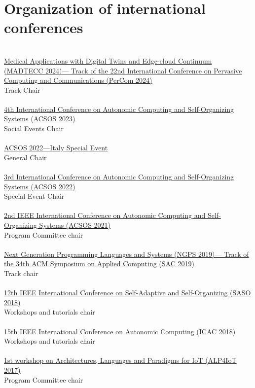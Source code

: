 \section{{\color{black}Organization of international conferences}}
\halfblankline \\
\href{https://madtecc.github.io/}{Medical Applications with Digital Twins and Edge-cloud Continuum (MADTECC 2024)---%
Track of the 22nd International Conference on Pervasive Computing and Communications (PerCom 2024)}
\\ Track Chair \\
\halfblankline \\
\href{https://conf.researchr.org/home/acsos-2023/}{4th International Conference on Autonomic Computing and Self-Organizing Systems
(ACSOS 2023)}
\\ Social Events Chair \\
\halfblankline \\
\href{https://2022.acsos.org/track/acsos-2022-special-events\#acsos-italy-special-event}{ACSOS 2022---Italy Special Event}
\\ General Chair \\
\halfblankline \\
\href{https://conf.researchr.org/home/acsos-2022/}{3rd International Conference on Autonomic Computing and Self-Organizing Systems
    (ACSOS 2022)}
\\ Special Event Chair \\
\halfblankline \\
\href{https://conf.researchr.org/home/acsos-2021}{2nd IEEE International Conference on Autonomic Computing and Self-Organizing Systems
(ACSOS 2021)}
\\ Program Committee chair \\
\halfblankline \\
\href{https://ngps2019.github.io/}{Next Generation Programming Languages and Systems (NGPS 2019)---%
Track of the 34th ACM Symposium on Applied Computing (SAC 2019)}
\\ Track chair \\
\halfblankline \\
\href{https://saso2018.fbk.eu/}{12th IEEE International Conference on Self-Adaptive and Self-Organizing (SASO 2018)}
\\ Workshops and tutorials chair \\
\halfblankline \\
\href{http://icac2018.informatik.uni-wuerzburg.de/committees/organization-committee/}{15th IEEE International Conference on Autonomic Computing (ICAC 2018)}
\\ Workshops and tutorials chair \\
\halfblankline \\
\href{http://apice.unibo.it/xwiki/bin/view/ALP4IoT2016/WebHome}{1st workshop on Architectures, Languages and Paradigms for IoT (ALP4IoT 2017)}
\\ Program Committee chair \\

